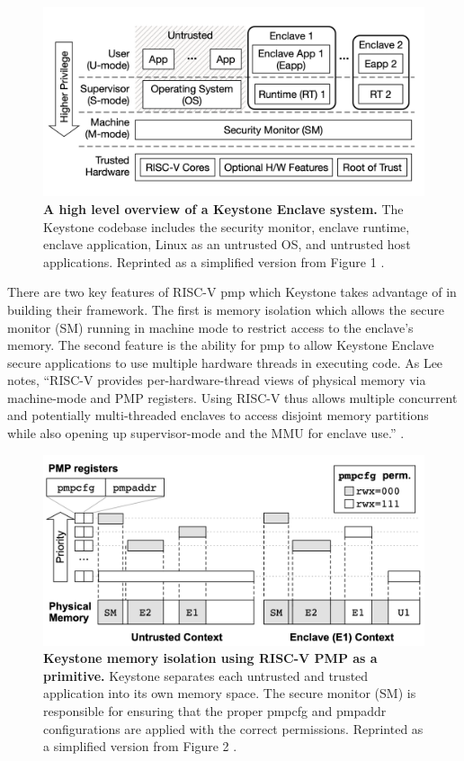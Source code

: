 \begin{figure}[h]
\includegraphics[width=\textwidth]{img/keystone-diagram-tmp.png}
\caption[Keystone System Overview]{\textbf{A high level overview of a Keystone Enclave system.} The Keystone codebase includes the security monitor, enclave runtime, enclave application, Linux as an untrusted OS, and untrusted host applications. Reprinted as a simplified version from Figure 1 \cite{lee2019keystone}.
\label{figure:keystone-overview}}
\end{figure}

There are two key features of RISC-V \gls{pmp} which Keystone takes advantage of in building their framework. The first is memory isolation which allows the secure monitor (SM) running in machine mode to restrict access to the enclave's memory. The second feature is the ability for \gls{pmp} to allow Keystone Enclave secure applications to use multiple hardware threads in executing code. As Lee notes, ``RISC-V provides per-hardware-thread views of physical memory via machine-mode and PMP registers. Using RISC-V thus allows multiple concurrent and potentially multi-threaded enclaves to access disjoint memory partitions while also opening up supervisor-mode and the MMU for enclave use.'' \cite{lee2020keystone}. 

\begin{figure}[h]
\includegraphics[width=\textwidth]{img/keystone-pmp-tmp.png}
\caption[Keystone PMP Protection]{\textbf{Keystone memory isolation using RISC-V PMP as a primitive.} Keystone separates each untrusted and trusted application into its own memory space. The secure monitor (SM) is responsible for ensuring that the proper pmpcfg and pmpaddr configurations are applied with the correct permissions. Reprinted as a simplified version from Figure 2 \cite{lee2019keystone}.
\label{figure:keystone-pmp}}
\end{figure}

